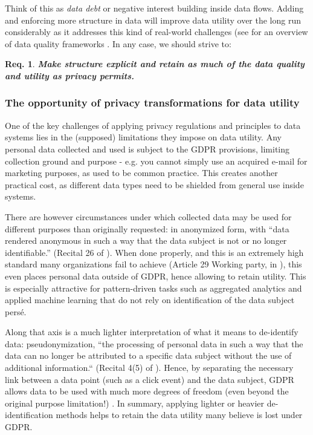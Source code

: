 \documentclass[11pt]{article} %
\newtheorem{requirement}{Req.}
\begin{document}
\newpage Think of this as \textit{data debt} or negative interest building inside data flows. Adding and enforcing more structure in data will improve data utility over the long run considerably as it addresses this kind of real-world challenges (see for an overview of data quality frameworks \cite{cichy2019overview}. In any case, we should strive to:
\begin{requirement}
\textit{\textbf{Make structure explicit and retain as much of the data quality and utility as privacy permits.}}
\end{requirement}

\subsubsection{The opportunity of privacy transformations for data utility}
One of the key challenges of applying privacy regulations and principles to data systems lies in the (supposed) limitations they impose on data utility. Any personal data collected and used is subject to the GDPR provisions, limiting collection ground and purpose - e.g. you cannot simply use an acquired e-mail for marketing purposes, as used to be common practice. This creates another practical cost, as different data types need to be shielded from general use inside systems. 

There are however circumstances under which collected data may be used for different purposes than originally requested: in anonymized form, with “data rendered anonymous in such a way that the data subject is not or no longer identifiable.” (Recital 26 of \cite{GDPR}). When done properly, and this is an extremely high standard many organizations fail to achieve (Article 29 Working party, in \cite{iapp2017}), this even places personal data outside of GDPR, hence allowing to retain utility. This is especially attractive for pattern-driven tasks such as aggregated analytics and applied machine learning that do not rely on identification of the data subject persé.

Along that axis is a much lighter interpretation of what it means to de-identify data: pseudonymization, ``the processing of personal data in such a way that the data can no longer be attributed to a specific data subject without the use of additional information.`` (Recital 4(5) of \cite{GDPR}). Hence, by separating the necessary link between a data point (such as a click event) and the data subject, GDPR allows data to be used with much more degrees of freedom (even beyond the original purpose limitation!) \cite{iapp2017}. In summary, applying lighter or heavier de-identification methods helps to retain the data utility many believe is lost under GDPR.
\end{document}
